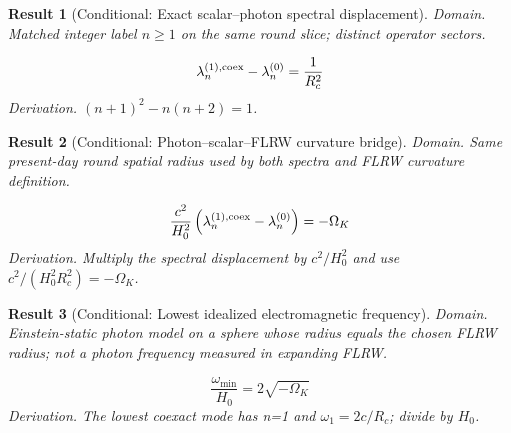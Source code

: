 \documentclass[aps,prd,onecolumn,notitlepage,groupedaddress,11pt]{revtex4-2}
\newtheorem{result}{Result}
\begin{document}
\begin{result}[\textsf{Conditional}: Exact scalar--photon spectral displacement]\label{bridge:19}
\textit{Domain.} Matched integer label \(n\ge1\) on the same round slice; distinct operator sectors.\par
\begin{equation}\label{bridgeeq:19}
\lambda^{(1),\rm coex}_n-\lambda^{(0)}_n=\frac1{R_c^2}
\end{equation}
\textit{Derivation.} \((n+1)^2-n(n+2)=1\).
\end{result}
\begin{result}[\textsf{Conditional}: Photon--scalar--FLRW curvature bridge]\label{bridge:20}
\textit{Domain.} Same present-day round spatial radius used by both spectra and FLRW curvature definition.\par
\begin{equation}\label{bridgeeq:20}
\frac{c^2}{H_0^2}\left(\lambda^{(1),\rm coex}_n-\lambda^{(0)}_n\right)=-\Omega_K
\end{equation}
\textit{Derivation.} Multiply the spectral displacement by \(c^2/H_0^2\) and use \(c^2/(H_0^2R_c^2)=-\Omega_K\).
\end{result}
\begin{result}[\textsf{Conditional}: Lowest idealized electromagnetic frequency]\label{bridge:21}
\textit{Domain.} Einstein-static photon model on a sphere whose radius equals the chosen FLRW radius; not a photon frequency measured in expanding FLRW.\par
\begin{equation}\label{bridgeeq:21}
\frac{\omega_{\min}}{H_0}=2\sqrt{-\Omega_K}
\end{equation}
\textit{Derivation.} The lowest coexact mode has n=1 and \(\omega_1=2c/R_c\); divide by \(H_0\).
\end{result}
\end{document}
